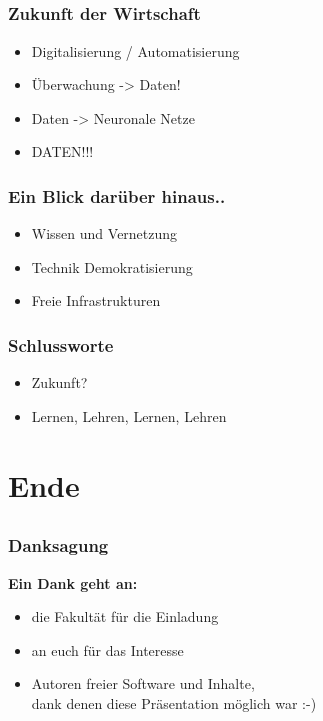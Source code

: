 \documentclass[12pt]{beamer}
\begin{document}
  \subsection{}
  
\begin{frame}
	\frametitle{Zukunft der Wirtschaft}
	\begin{itemize}
		\item<1-> Digitalisierung / Automatisierung
		\item<2-> Überwachung -> Daten!
		\item<3-> Daten -> Neuronale Netze
		\item<4-> DATEN!!!
	\end{itemize}
\end{frame}

\begin{frame}
	\frametitle{Ein Blick darüber hinaus..}
	\begin{itemize}
		\item<1-> Wissen und Vernetzung
		\item<2-> Technik Demokratisierung
		\item<3-> Freie Infrastrukturen
	\end{itemize}
\end{frame}


\begin{frame}
	\frametitle{Schlussworte}
	\begin{itemize}
		\item<1-> Zukunft?
		\item<2-> Lernen, Lehren, Lernen, Lehren
	\end{itemize}
\end{frame}

\section{Ende}
	\subsection{}

\begin{frame}
	\frametitle{Danksagung}
	\begin{center}
		\textbf{Ein Dank geht an:}
		\begin{itemize}
			\item<1-> die Fakultät für die Einladung
			\item<2-> an euch für das Interesse
			\item<3-> Autoren freier Software und Inhalte,\\ dank denen diese Präsentation möglich war  :-)
		\end{itemize}
	\end{center}
\end{frame}
  
\end{document}
